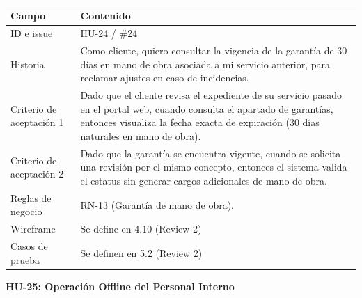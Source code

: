 {\def\LTcaptype{none} %
\begin{longtable}[]{@{}
  >{\raggedright\arraybackslash}p{}
  >{\raggedright\arraybackslash}p{}@{}}
\toprule\noalign{}
\begin{minipage}[b]{\linewidth}\raggedright
\textbf{Campo}
\end{minipage} & \begin{minipage}[b]{\linewidth}\raggedright
\textbf{Contenido}
\end{minipage} \\
\midrule\noalign{}
\endhead
\bottomrule\noalign{}
\endlastfoot
ID e issue & HU-24 / \#24 \\
Historia & Como cliente, quiero consultar la vigencia de la garantía de
30 días en mano de obra asociada a mi servicio anterior, para reclamar
ajustes en caso de incidencias. \\
Criterio de aceptación 1 & Dado que el cliente revisa el expediente de
su servicio pasado en el portal web, cuando consulta el apartado de
garantías, entonces visualiza la fecha exacta de expiración (30 días
naturales en mano de obra). \\
Criterio de aceptación 2 & Dado que la garantía se encuentra vigente,
cuando se solicita una revisión por el mismo concepto, entonces el
sistema valida el estatus sin generar cargos adicionales de mano de
obra. \\
Reglas de negocio & RN-13 (Garantía de mano de obra). \\
Wireframe & Se define en 4.10 (Review 2) \\
Casos de prueba & Se definen en 5.2 (Review 2) \\
\end{longtable}
}

\textbf{HU-25: Operación Offline del Personal Interno}

